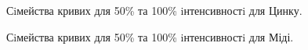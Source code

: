 \documentclass[a4paper,14pt]{extreport}
\begin{document}
\begin{figure}[h]
\caption{Сiмейства кривих для 50\% та 100\% iнтенсивностi для Цинку.}
\label{ris1}
\end{figure}


\begin{figure}[h]
\caption{Сiмейства кривих для 50\% та 100\% iнтенсивностi для Міді.}
\label{ris1}
\end{figure}
\end{document}
